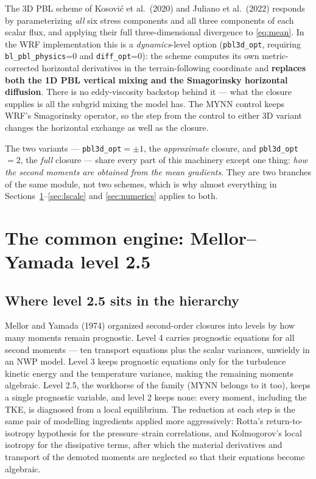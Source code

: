 \documentclass[10pt,a4paper]{article}
\newcommand{\keytag}[1]{\colorbox{keyc}{\textcolor{white}{\sffamily\bfseries\scriptsize K#1}}}
\newcommand{\key}[1]{\marginpar[\raggedleft\keytag{#1}]{\raggedright\keytag{#1}}\ignorespaces}
\newcommand{\kh}[1]{{\color{keyc!80!black}\bfseries #1}}
\begin{document}
The 3D PBL scheme of Kosović et al.\ (2020) and Juliano et al.\ (2022) responds by parameterizing \emph{all} six stress components and all three components of each scalar flux, and applying their full three-dimensional divergence to \eqref{eq:mean}. In the WRF implementation this is a \emph{dynamics}-level option (\texttt{pbl3d\_opt}, requiring \texttt{bl\_pbl\_physics}=0 and \texttt{diff\_opt}=0): \key{2}the scheme computes its own metric-corrected horizontal derivatives in the terrain-following coordinate and \kh{replaces both the 1D PBL vertical mixing and the Smagorinsky horizontal diffusion}. There is no eddy-viscosity backstop behind it — what the closure supplies is all the subgrid mixing the model has. The MYNN control keeps WRF's Smagorinsky operator, so the step from the control to either 3D variant changes the horizontal exchange as well as the closure.

The two variants — \texttt{pbl3d\_opt}$=\pm1$, the \emph{approximate} closure, and \texttt{pbl3d\_opt}$=2$, the \emph{full} closure — share every part of this machinery except one thing: \emph{how the second moments are obtained from the mean gradients}. They are two branches of the same module, not two schemes, which is why almost everything in Sections~\ref{sec:core}--\ref{sec:lscale} and \ref{sec:numerics} applies to both.

\section{The common engine: Mellor--Yamada level 2.5}
\label{sec:core}

\subsection{Where level 2.5 sits in the hierarchy}

Mellor and Yamada (1974) organized second-order closures into levels by how many moments remain prognostic. Level 4 carries prognostic equations for all second moments — ten transport equations plus the scalar variances, unwieldy in an NWP model. Level 3 keeps prognostic equations only for the turbulence kinetic energy and the temperature variance, making the remaining moments algebraic. Level 2.5, the workhorse of the family (MYNN belongs to it too), keeps a single prognostic variable, and level 2 keeps none: every moment, including the TKE, is diagnosed from a local equilibrium. The reduction at each step is the same pair of modelling ingredients applied more aggressively: Rotta's return-to-isotropy hypothesis for the pressure--strain correlations, and Kolmogorov's local isotropy for the dissipative terms, after which the material derivatives and transport of the demoted moments are neglected so that their equations become algebraic.
\end{document}
